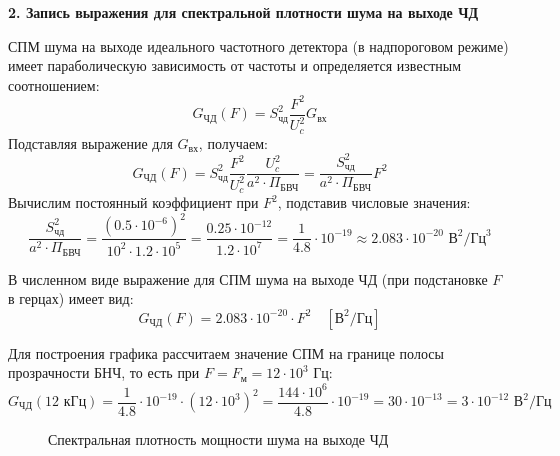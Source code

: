 \vspace{1em}
\textbf{2. Запись выражения для спектральной плотности шума на выходе ЧД}

СПМ шума на выходе идеального частотного детектора (в надпороговом режиме) имеет параболическую зависимость от частоты и определяется известным соотношением:
\begin{equation*}
    G_{\text{ЧД}}(F) = S_{\text{чд}}^2 \frac{F^2}{U_c^2} G_{\text{вх}}
\end{equation*}
Подставляя выражение для $G_{\text{вх}}$, получаем:
\begin{equation*}
    G_{\text{ЧД}}(F) = S_{\text{чд}}^2 \frac{F^2}{U_c^2} \frac{U_c^2}{a^2 \cdot \Pi_{\text{БВЧ}}} = \frac{S_{\text{чд}}^2}{a^2 \cdot \Pi_{\text{БВЧ}}} F^2
\end{equation*}
Вычислим постоянный коэффициент при $F^2$, подставив числовые значения:
\begin{equation*}
    \frac{S_{\text{чд}}^2}{a^2 \cdot \Pi_{\text{БВЧ}}} = \frac{(0.5 \cdot 10^{-6})^2}{10^2 \cdot 1.2 \cdot 10^5} = \frac{0.25 \cdot 10^{-12}}{1.2 \cdot 10^7} = \frac{1}{4.8} \cdot 10^{-19} \approx 2.083 \cdot 10^{-20} \text{ В}^2/\text{Гц}^3
\end{equation*}

В численном виде выражение для СПМ шума на выходе ЧД (при подстановке $F$ в герцах) имеет вид:
\begin{equation*}
    G_{\text{ЧД}}(F) = 2.083 \cdot 10^{-20} \cdot F^2 \quad [\text{В}^2/\text{Гц}]
\end{equation*}

Для построения графика рассчитаем значение СПМ на границе полосы прозрачности БНЧ, то есть при $F = F_{\text{м}} = 12 \cdot 10^3 \text{ Гц}$:
\begin{equation*}
    G_{\text{ЧД}}(12 \text{ кГц}) = \frac{1}{4.8} \cdot 10^{-19} \cdot (12 \cdot 10^3)^2 = \frac{144 \cdot 10^6}{4.8} \cdot 10^{-19} = 30 \cdot 10^{-13} = 3 \cdot 10^{-12} \text{ В}^2/\text{Гц}
\end{equation*}

\begin{figure}[h]
    \centering
    \caption{Спектральная плотность мощности шума на выходе ЧД}
\end{figure}


